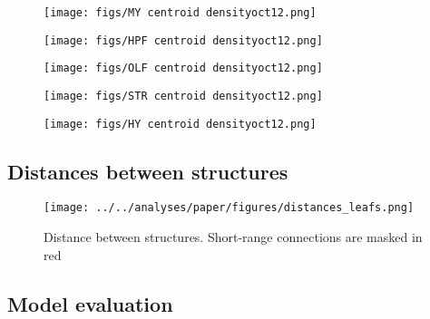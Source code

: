 \begin{figure}[H]
    \centering
    \texttt{[image: figs/MY centroid densityoct12.png]} 
    \label{fig:my_label}
\end{figure}
\newpage

\begin{figure}[H]
    \centering
    \texttt{[image: figs/HPF centroid densityoct12.png]} 
    \label{fig:my_label}
\end{figure}
\newpage

\begin{figure}[H]
    \centering
    \texttt{[image: figs/OLF centroid densityoct12.png]} 
    \label{fig:my_label}
\end{figure}
\newpage

\begin{figure}[H]
    \centering
    \texttt{[image: figs/STR centroid densityoct12.png]} 
    \label{fig:my_label}
\end{figure}
\newpage

\begin{figure}[H]
    \centering
    \texttt{[image: figs/HY centroid densityoct12.png]} 
    \label{fig:my_label}
\end{figure}

\newpage

\subsection{Distances between structures}

\begin{figure}[H]
    \centering
    \texttt{[image: ../../analyses/paper/figures/distances\_leafs.png]} 
    \caption{Distance between structures.  Short-range connections are masked in red}
    \label{fig:dist_bw_str}
\end{figure}

\subsection{Model evaluation}
\label{supp_sec:model-evaluation}

